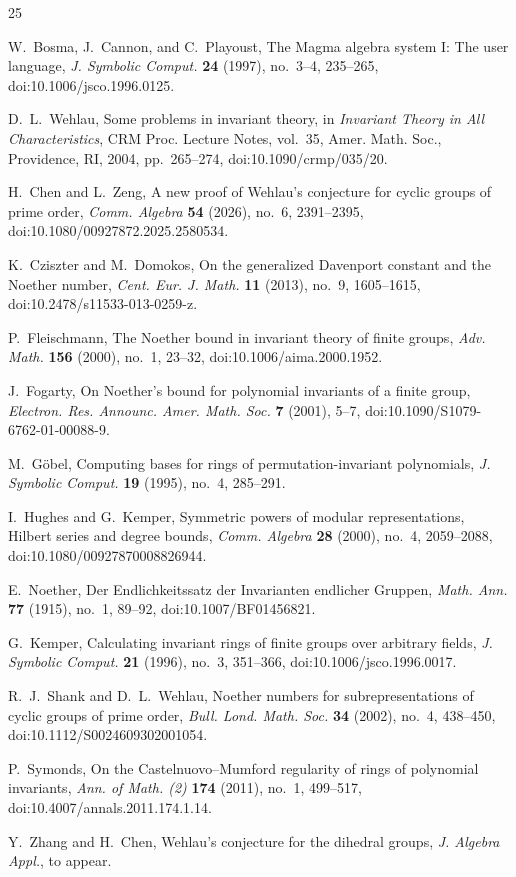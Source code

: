 \documentclass[11pt]{article}
\theoremstyle{definition}
\begin{document}
	\begin{thebibliography}{25}
		
		 W.~Bosma, J.~Cannon, and C.~Playoust, The Magma algebra system I: The user language, \emph{J. Symbolic Comput.} \textbf{24} (1997), no.~3--4, 235--265, doi:10.1006/jsco.1996.0125.
		
		 D.~L.~Wehlau, Some problems in invariant theory, in \emph{Invariant Theory in All Characteristics}, CRM Proc. Lecture Notes, vol.~35, Amer. Math. Soc., Providence, RI, 2004, pp.~265--274, doi:10.1090/crmp/035/20.
		
		 H.~Chen and L.~Zeng, A new proof of Wehlau's conjecture for cyclic groups of prime order, \emph{Comm. Algebra} \textbf{54} (2026), no.~6, 2391--2395, doi:10.1080/00927872.2025.2580534.
		
		 K.~Cziszter and M.~Domokos, On the generalized Davenport constant and the Noether number, \emph{Cent. Eur. J. Math.} \textbf{11} (2013), no.~9, 1605--1615, doi:10.2478/s11533-013-0259-z.
		
		 P.~Fleischmann, The Noether bound in invariant theory of finite groups, \emph{Adv. Math.} \textbf{156} (2000), no.~1, 23--32, doi:10.1006/aima.2000.1952.
		
		 J.~Fogarty, On Noether's bound for polynomial invariants of a finite group, \emph{Electron. Res. Announc. Amer. Math. Soc.} \textbf{7} (2001), 5--7, doi:10.1090/S1079-6762-01-00088-9.
		
		 M.~G\"obel, Computing bases for rings of permutation-invariant polynomials, \emph{J. Symbolic Comput.} \textbf{19} (1995), no.~4, 285--291.
		
		 I.~Hughes and G.~Kemper, Symmetric powers of modular representations, Hilbert series and degree bounds, \emph{Comm. Algebra} \textbf{28} (2000), no.~4, 2059--2088, doi:10.1080/00927870008826944.
		
		 E.~Noether, Der Endlichkeitssatz der Invarianten endlicher Gruppen, \emph{Math. Ann.} \textbf{77} (1915), no.~1, 89--92, doi:10.1007/BF01456821.
		
		 G.~Kemper, Calculating invariant rings of finite groups over arbitrary fields, \emph{J. Symbolic Comput.} \textbf{21} (1996), no.~3, 351--366, doi:10.1006/jsco.1996.0017.
		
		 R.~J.~Shank and D.~L.~Wehlau, Noether numbers for subrepresentations of cyclic groups of prime order, \emph{Bull. Lond. Math. Soc.} \textbf{34} (2002), no.~4, 438--450, doi:10.1112/S0024609302001054.
		
		 P.~Symonds, On the Castelnuovo--Mumford regularity of rings of polynomial invariants, \emph{Ann. of Math. (2)} \textbf{174} (2011), no.~1, 499--517, doi:10.4007/annals.2011.174.1.14.
		
		 Y.~Zhang and H.~Chen, Wehlau's conjecture for the dihedral groups, \emph{J. Algebra Appl.}, to appear.
		
	\end{thebibliography}
	
\end{document}
